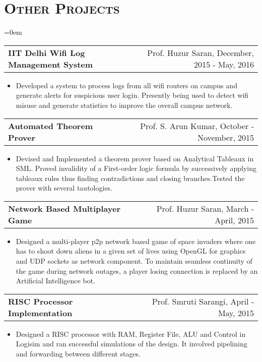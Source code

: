 \documentclass{article}
\makeatletter
\newenvironment{longversion}{}{} %
\newcommand{\headerrow}[2]
{\begin{tabular*}{\linewidth}{l@{\extracolsep{\fill}}r}
	#1 &
	#2 \\
\end{tabular*}}
\newcommand{\tmpsection}[1]{}
\let\tmpsection=\section
\renewcommand{\section}[1]{\tmpsection*{\textsc{#1}}}
\makeatother
\begin{document}
\begin{longversion}
\section{Other Projects}
\begin{list} {}{\leftmargin=0em}
\setlength{\leftmargin}{0pt}

\item[]
  \headerrow {\textbf{IIT Delhi Wifi Log Management System}} {Prof. Huzur Saran, December, 2015 - May, 2016}
  \begin{itemize} \item[]
  Developed a system to process logs from all wifi routers on campus and generate alerts for suspicious user login. Presently being used to detect wifi misuse and generate statistics to improve the overall campus network.
  \end{itemize}

\item[]
  \headerrow {\textbf{Automated Theorem Prover}} {Prof. S. Arun Kumar, October - November, 2015}
  \begin{itemize} \item[]
  Devised and Implemented a theorem prover based on Analytical Tableaux in SML. Proved invalidity of a First-order logic formula by successively applying tableaux rules thus finding contradictions and closing branches.Tested the prover with several tautologies.
  \end{itemize}

\item[]
  \headerrow {\textbf{Network Based Multiplayer Game}} {Prof. Huzur Saran, March - April, 2015}
  \begin{itemize} \item[]
  Designed a multi-player p2p network based game of space invaders where one has to shoot down aliens in a given set of lives using OpenGL for graphics and UDP sockets as network component. To maintain seamless continuity of the game during network outages, a player losing connection is replaced by an Artificial Intelligence bot. 
  \end{itemize}


\item[]
  \headerrow{ \textbf{RISC Processor Implementation}} {Prof. Smruti Sarangi, April - May, 2015}
  \begin{itemize} \item[]
  Designed a RISC processor with RAM, Register File, ALU and Control in Logisim and ran successful simulations of the design. It involved pipelining and forwarding between different stages.
  \end{itemize}


\end{list}
\end{longversion}
\end{document}
